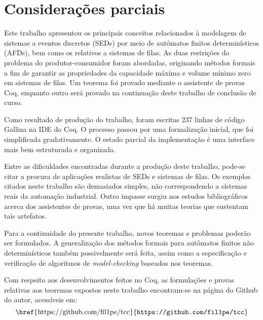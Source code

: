 \chapter{Considerações parciais}
\label{cap:consideracoes}

Este trabalho apresentou os principais conceitos relacionados à modelagem de sistemas a eventos discretos (\acs{SED}s) por meio de autômatos finitos determinísticos (\acs{AFD}s), bem como os relativos a sistemas de filas. As duas restrições do problema do produtor-consumidor foram abordadas, originando métodos formais a fim de garantir as propriedades da capacidade máxima e volume mínimo zero em sistemas de filas. Um teorema foi provado mediante o assistente de provas Coq, enquanto outro será provado na continuação deste trabalho de conclusão de curso.

Como resultado de produção do trabalho, foram escritas 237 linhas de código Gallina na IDE do Coq. O processo passou por uma formalização inicial, que foi simplificada gradativamente. O estado parcial da implementação é uma interface mais bem estruturada e organizada.

Entre as dificuldades encontradas durante a produção deste trabalho, pode-se citar a procura de aplicações realistas de SEDs e sistemas de filas. Os exemplos citados neste trabalho são demasiados simples, não correspondendo a sistemas reais da automação industrial. Outro impasse surgiu nos estudos bibliográficos acerca dos assistentes de provas, uma vez que há muitas teorias que sustentam tais artefatos.

Para a continuidade do presente trabalho, novos teoremas e problemas poderão ser formulados. A generalização dos métodos formais para autômatos finitos não determinísticos também possivelmente será feita, assim como a especificação e verificação de algoritmos de \textit{model-checking} baseados nos teoremas.

Com respeito aos desenvolvimentos feitos no Coq, as formulações e provas relativas aos teoremas expostos neste trabalho encontram-se na página do Github do autor, acessíveis em: $$\text{\href{https://github.com/fil1pe/tcc}{\texttt{https://github.com/fil1pe/tcc}}}$$